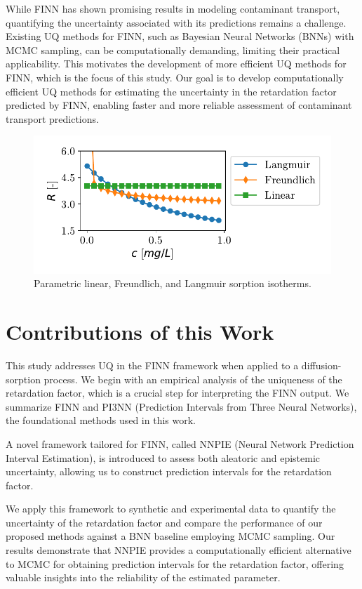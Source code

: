 While FINN has shown promising results in modeling contaminant transport, quantifying the uncertainty associated with its predictions remains a challenge. Existing UQ methods for FINN, such as Bayesian Neural Networks (BNNs) with MCMC sampling, can be computationally demanding, limiting their practical applicability. This motivates the development of more efficient UQ methods for FINN, which is the focus of this study. Our goal is to develop computationally efficient UQ methods for estimating the uncertainty in the retardation factor predicted by FINN, enabling faster and more reliable assessment of contaminant transport predictions.

\begin{figure}[h]
    \centering
    \includegraphics{figs/parametric_isotherms.pdf}
    \caption{Parametric linear, Freundlich, and Langmuir sorption isotherms.}
    \label{fig:parametric_isotherms}
\end{figure}


\section{Contributions of this Work}
This study addresses UQ in the FINN framework when applied to a diffusion-sorption process. We begin with an empirical analysis of the uniqueness of the retardation factor, which is a crucial step for interpreting the FINN output. We summarize FINN and PI3NN (Prediction Intervals from Three Neural Networks), the foundational methods used in this work.

A novel framework tailored for FINN, called NNPIE (Neural Network Prediction Interval Estimation), is introduced to assess both aleatoric and epistemic uncertainty, allowing us to construct prediction intervals for the retardation factor.

We apply this framework to synthetic and experimental data to quantify the uncertainty of the retardation factor and compare the performance of our proposed methods against a BNN baseline employing MCMC sampling. Our results demonstrate that NNPIE provides a computationally efficient alternative to MCMC for obtaining prediction intervals for the retardation factor, offering valuable insights into the reliability of the estimated parameter.


